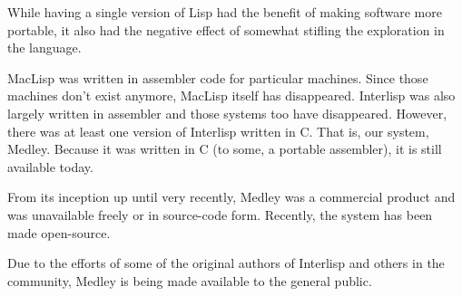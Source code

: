 While having a single version of Lisp had the benefit of making
software more portable, it also had the negative effect of 
somewhat stifling the exploration in the language.

MacLisp was written in assembler code for particular machines.  Since
those machines don't exist anymore, MacLisp itself has disappeared.
Interlisp was also largely written in assembler and those systems too
have disappeared.  However, there was at least one version of Interlisp
written in C.  That is, our system, Medley.  Because it was written in
C (to some, a portable assembler), it is still available today.

From its inception up until very recently, Medley was a commercial
product and was unavailable freely or in source-code form.  Recently,
the system has been made open-source.

Due to the efforts of some of the original authors of Interlisp and
others in the community, Medley is being made available to the
general public.







